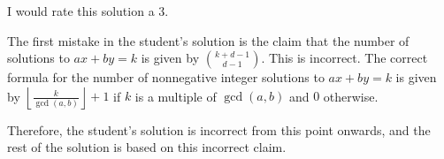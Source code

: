 I would rate this solution a 3.

The first mistake in the student's solution is the claim that the number of solutions to $ax + by = k$ is given by $\binom{k+d-1}{d-1}$. This is incorrect. The correct formula for the number of nonnegative integer solutions to $ax + by = k$ is given by $\left\lfloor \frac{k}{\gcd(a,b)} \right\rfloor + 1$ if $k$ is a multiple of $\gcd(a,b)$ and $0$ otherwise.

Therefore, the student's solution is incorrect from this point onwards, and the rest of the solution is based on this incorrect claim.

